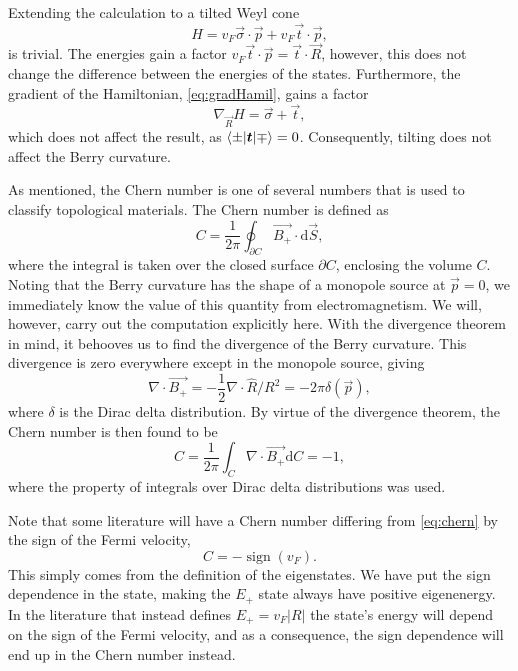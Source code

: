 Extending the calculation to a tilted Weyl cone
\begin{equation}
  H = v_F \vec{\sigma} \cdot \vec{p} + v_F \vec{t} \cdot \vec{p},
\end{equation}
is trivial.
The energies gain a factor \( v_F \vec{t}\cdot \vec{p} = \vec{t} \cdot \vec{R}\), however, this does not change the difference between the energies of the states.
Furthermore, the gradient of the Hamiltonian, \cref{eq:gradHamil}, gains a factor
\begin{equation}
  \nabla_{\vec{R}} H = \vec\sigma + \vec{t},
\end{equation}
which does not affect the result, as \( \braket{\pm | \bm{t} | \mp} = 0 \).
Consequently, tilting does not affect the Berry curvature.

As mentioned, the Chern number is one of several numbers that is used to classify topological materials.
The Chern number is defined as
\begin{equation}
  C = \frac{1}{2\pi} \oint_{\partial C} \vec{B_+} \cdot \mathrm{d}\vec{S},
\end{equation}
where the integral is taken over the closed surface $\partial C$, enclosing the volume $C$.
Noting that the Berry curvature has the shape of a monopole source at $\vec{p} = 0$, we immediately know the value of this quantity from electromagnetism.
We will, however, carry out the computation explicitly here.
With the divergence theorem in mind, it behooves us to find the divergence of the Berry curvature.
This divergence is zero everywhere except in the monopole source, giving
\begin{equation}
  \nabla \cdot \vec{B_+} = -\frac12 \nabla \cdot \hat{R} / R^2 = -2 \pi \delta(\vec{p}),
\end{equation}
where $\delta$ is the Dirac delta distribution.
By virtue of the divergence theorem, the Chern number is then found to be
\begin{equation}\label{eq:chern}
  C = \frac{1}{2\pi} \int_C \nabla \cdot \vec{B_+} \mathrm{d} C = -1,
\end{equation}
where the property of integrals over Dirac delta distributions was used.

Note that some literature will have a Chern number differing from \cref{eq:chern} by the sign of the Fermi velocity,
\begin{equation}
  C = - \operatorname{sign}(v_F).
\end{equation}
This simply comes from the definition of the eigenstates.
We have put the sign dependence in the state, making the $E_+$ state always have positive eigenenergy.
In the literature that instead defines $E_+ = v_F |R|$ the state's energy will depend on the sign of the Fermi velocity, and as a consequence, the sign dependence will end up in the Chern number instead.

